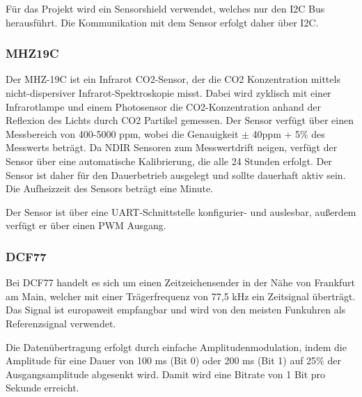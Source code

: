 \documentclass[a4paper,11pt]{article}
\begin{document}
\noindent
Für das Projekt wird ein Sensorshield verwendet, welches nur den I2C Bus herausführt. Die Kommunikation mit dem Sensor erfolgt daher über I2C. 

\subsubsection{MHZ19C}
\label{subsubsub:mhz19c}

Der MHZ-19C ist ein Infrarot CO2-Sensor, der die CO2 Konzentration mittels nicht-dispersiver Infrarot-Spektroskopie misst. Dabei wird zyklisch mit einer Infrarotlampe
und einem Photosensor die CO2-Konzentration anhand der Reflexion des Lichts durch CO2 Partikel gemessen. 
Der Sensor verfügt über einen Messbereich von 400-5000 ppm, wobei die Genauigkeit $\pm$ 40ppm + 5\% des Messwerts beträgt. 
Da NDIR Sensoren zum Messwertdrift neigen, verfügt der Sensor über eine automatische Kalibrierung, die alle 24 Stunden erfolgt. Der Sensor ist daher für den Dauerbetrieb ausgelegt
und sollte dauerhaft aktiv sein. 
Die Aufheizzeit des Sensors beträgt eine Minute. 

\noindent
Der Sensor ist über eine UART-Schnittstelle konfigurier- und auslesbar, außerdem verfügt er über einen PWM Ausgang. 

\subsubsection{DCF77}
\label{subsubsub:dcf77}

Bei DCF77 handelt es sich um einen Zeitzeichensender in der Nähe von Frankfurt am Main, welcher mit einer Trägerfrequenz von 77,5 kHz ein Zeitsignal überträgt. 
Das Signal ist europaweit empfangbar und wird von den meisten Funkuhren als Referenzsignal verwendet.  

\noindent
Die Datenübertragung erfolgt durch einfache Amplitudenmodulation, indem die Amplitude für eine Dauer von 100 ms (Bit 0) oder 200 ms (Bit 1) auf 25\% der Ausgangsamplitude abgesenkt wird. 
Damit wird eine Bitrate von 1 Bit pro Sekunde erreicht. 
\end{document}
